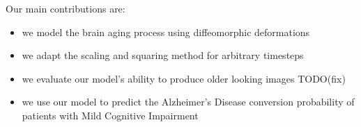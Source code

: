 Our main contributions are:

\begin{itemize}
	\item we model the brain aging process using diffeomorphic deformations%
	\item we adapt the scaling and squaring method for arbitrary timesteps
	\item we evaluate our model's ability to produce older looking images TODO(fix)
	\item we use our model to predict the Alzheimer's Disease conversion probability of patients with Mild Cognitive Impairment
\end{itemize}
